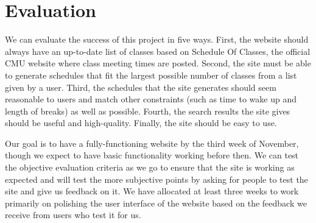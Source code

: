 \section{Evaluation}
We can evaluate the success of this project in five ways. First, the website
should always have an up-to-date list of classes based on Schedule Of Classes,
the official CMU website where class meeting times are posted. Second, the site
must be able to generate schedules that fit the largest possible number of
classes from a list given by a user. Third, the schedules that the site
generates should seem reasonable to users and match other constraints (such as
time to wake up and length of breaks) as well as possible. Fourth, the search
results the site gives should be useful and high-quality. Finally, the site
should be easy to use.

Our goal is to have a fully-functioning website by the third week of November,
though we expect to have basic functionality working before then.  We can test
the objective evaluation criteria as we go to ensure that the site is working
as expected and will test the more subjective points by asking for people to
test the site and give us feedback on it. We have allocated at least three weeks
to work primarily on polishing the user interface of the website based on the
feedback we receive from users who test it for us.
